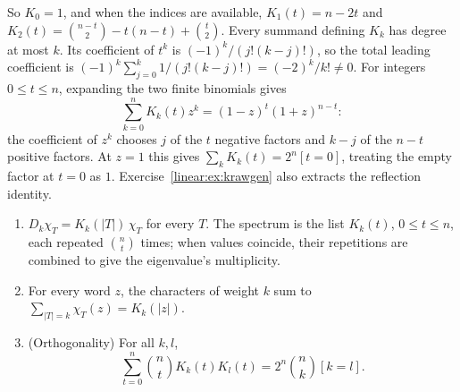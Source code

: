 So $K_0=1$, and when the indices are available,
$K_1(t)=n-2t$ and $K_2(t)=\binom{n-t}2-t(n-t)+\binom t2$.
Every summand defining $K_k$ has degree at most $k$. Its coefficient of $t^k$
is $(-1)^k/(j!(k-j)!)$, so the total leading coefficient is
$(-1)^k\sum_{j=0}^k1/(j!(k-j)!)=(-2)^k/k!\ne0$.
For integers $0\le t\le n$, expanding the two finite binomials gives
\[
\sum_{k=0}^n K_k(t)z^k=(1-z)^t(1+z)^{n-t}:
\]
the coefficient of $z^k$ chooses $j$ of the $t$ negative factors and $k-j$
of the $n-t$ positive factors. At $z=1$ this gives
$\sum_k K_k(t)=2^n[t=0]$, treating the empty factor at $t=0$ as $1$.
Exercise~\ref{linear:ex:krawgen} also extracts the reflection identity.

\begin{theorem}\label{linear:thm:krawtchouk}
\begin{enumerate}[label=(\roman*)]
\item $D_k\chi_T=K_k(|T|)\,\chi_T$ for every $T$. The spectrum is the list
$K_k(t)$, $0\le t\le n$, each repeated $\binom nt$ times; when values
coincide, their repetitions are combined to give the eigenvalue's multiplicity.
\item For every word $z$, the characters of weight $k$ sum to $\sum_{|T|=k}\chi_T(z)=K_k(|z|)$.
\item (Orthogonality) For all $k,l$,
\[
\sum_{t=0}^n\binom ntK_k(t)K_l(t)=2^n\binom nk[k=l].
\]
\end{enumerate}
\end{theorem}
